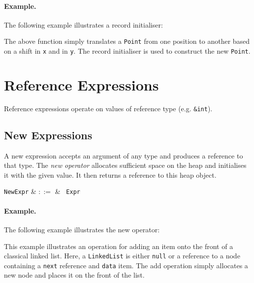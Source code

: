 \paragraph{Example.} The following example illustrates a record initialiser:



The above function simply translates a \lstinline{Point} from one position to another based on a shift in \lstinline{x} and in \lstinline{y}.  The record initialiser is used to construct the new \lstinline{Point}.

\section{Reference Expressions}

Reference expressions operate on values of reference type (e.g. \lstinline{&int}).


\subsection{New Expressions}
\label{c_expr_new}

A new expression accepts an argument of any type and produces a reference to that type.  The {\em new operator} allocates sufficient space on the heap and initialises it with the given value.  It then returns a reference to this heap object.

\begin{syntax}
\verb+NewExpr+ & $::=$ & \ \verb+Expr+\\
\end{syntax}

\paragraph{Example.} The following example illustrates the new operator:



This example illustrates an operation for adding an item onto the front of a classical linked list.  Here, a \lstinline{LinkedList} is either \lstinline{null} or a reference to a node containing a \lstinline{next} reference and \lstinline{data} item.  The add operation simply allocates a new node and places it on the front of the list.

